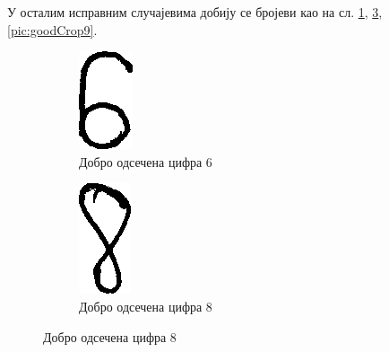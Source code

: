 У осталим исправним случајевима добију се бројеви као на сл.  \ref{pic:goodCrop6}, \ref{pic:goodCrop8}, \ref{pic:goodCrop9}.
\begin{figure}[htb!]\caption{Добро одсечене}
\begin{subfigure}{.3\textwidth}
\centering
\includegraphics[width=.4\linewidth]{pictures/1/GoodCrop6}
\caption{Добро одсечена цифра 6}\label{pic:goodCrop6}
\end{subfigure}
\begin{subfigure}{.26\textwidth}
\centering
\includegraphics[width=.4\linewidth]{pictures/1/GoodCrop8}
\caption{Добро одсечена цифра 8}\label{pic:goodCrop8}

\end{subfigure}
\end{figure}
